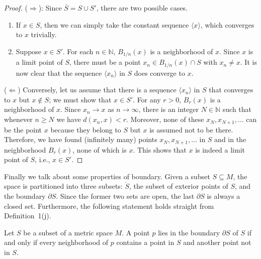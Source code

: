 \begin{proof}
  ($\Rightarrow$): Since $\overline{S} = S \cup S'$, there are two possible cases.
  \begin{enumerate}
    \item If $x \in S$, then we can simply take the constant sequence $\langle x \rangle$, which converges to $x$ trivially.

    \item Suppose $x \in S'$.  For each $n \in \mathbb{N}$, $B_{1/n}(x)$ is a neighborhood of $x$.  Since $x$ is a limit point of $S$, there must be a point $x_n \in B_{1/n}(x) \cap S$ with $x_n \ne x$.  It is now clear that the sequence $\langle x_n \rangle$ in $S$ does converge to $x$.
  \end{enumerate}

  ($\Leftarrow$) Conversely, let us assume that there is a sequence $\langle x_n \rangle$ in $S$ that converges to $x$ but $x \notin S$; we must show that $x \in S'$.  For any $r > 0$, $B_r(x)$ is a neighborhood of $x$.  Since $x_n \to x$ as $n \to \infty$, there is an integer $N \in \mathbb{N}$ such that whenever $n \geqslant N$ we have $d(x_n,x) < r$.  Moreover, none of these $x_N, x_{N+1}, \dots$ can be the point $x$ because they belong to $S$ but $x$ is assumed not to be there.  Therefore, we have found (infinitely many) points $x_N, x_{N+1}, \dots$ in $S$ and in the neighborhood $B_r(x)$, none of which is $x$.  This shows that $x$ is indeed a limit point of $S$, i.e., $x \in S'$.
\end{proof}

Finally we talk about some properties of boundary.
Given a subset $S \subseteq M$, the space is partitioned into three subsets: $\mathring{S}$, the subset of exterior points of $S$, and the boundary $\partial S$.  Since the former two sets are open, the last $\partial S$ is always a closed set.
Furthermore, the following statement holds straight from Definition~1(j).

\begin{prop}
  Let $S$ be a subset of a metric space $M$.
  A point $p$ lies in the boundary $\partial S$ of $S$ if and only if every neighborhood of $p$ contains a point in $S$ and another point not in $S$.
\end{prop}
